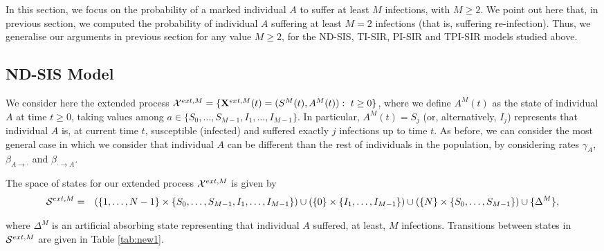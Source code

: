 \documentclass[10pt,A4paper]{article}
\begin{document}
\par In this section, we focus on the probability of a marked individual $A$ to suffer at least $M$ infections, with $M\geq2$. We point out
here that, in previous section, we computed the probability of individual $A$ suffering at least $M=2$ infections (that is, suffering re-infection).
Thus, we generalise our arguments in previous section for any value $M\geq2$, for the ND-SIS, TI-SIR, PI-SIR and TPI-SIR models studied above.

\subsection{ND-SIS Model}

\par We consider here the extended process ${\cal X}^{ext,M}=\{{\bf X}^{ext,M}(t)=(S^M(t),A^M(t)):\ t\geq0\}$, where we define $A^M(t)$ as the state of
individual $A$ at time $t\geq0$, taking values among $a\in\{S_0,\dots,S_{M-1},I_1,\dots,I_{M-1}\}$. In particular, $A^M(t)=S_j$ (or, alternatively,
$I_j$) represents that individual $A$ is, at current time $t$, susceptible (infected) and suffered exactly $j$ infections up to time $t$. As before, we
can consider the most general case in which we consider that individual $A$ can be different than the rest of individuals in the population, by
considering rates $\gamma_A$, $\beta_{A\rightarrow\cdot}$ and $\beta_{\cdot\rightarrow A}$.

\par The space of states for our extended process ${\cal X}^{ext,M}$ is given by
\begin{eqnarray*}
 {\cal S}^{ext,M} &=& \left(\{1,\dots,N-1\}\times\{S_0,\dots,S_{M-1},I_1,\dots,I_{M-1}\}\right)\cup\left(\{0\}\times\{I_1,\dots,I_{M-1}\}\right)\cup\left(\{N\}\times\{S_0,\dots,S_{M-1}\}\right)\cup\{\Delta^M\},
\end{eqnarray*}
\par\noindent where $\Delta^M$ is an artificial absorbing state representing that individual $A$ suffered, at least, $M$ infections. Transitions
between states in ${\cal S}^{ext,M}$ are given in Table \ref{tab:new1}.
\end{document}
